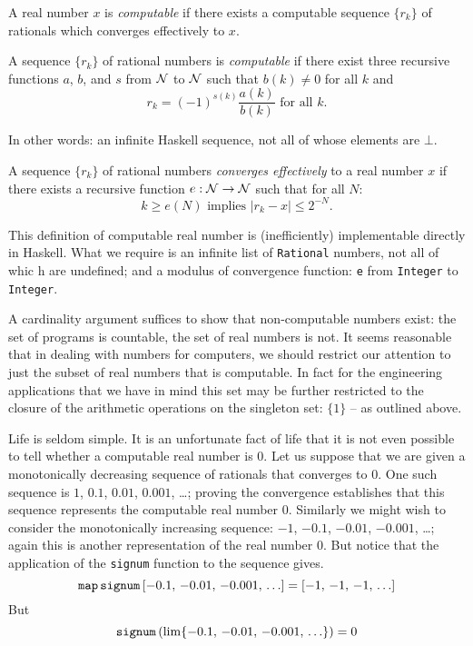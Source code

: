 \begin{definition}\rm
A real number $x$ is {\em computable} if there exists a computable
sequence $\{r_k\}$ of rationals which converges effectively to $x$.
\end{definition}

\begin{definition}\rm
A sequence $\{r_k\}$ of rational numbers is {\em computable} if there
exist three recursive functions $a$, $b$, and $s$ from ${\cal N}$ to
${\cal N}$ such that $b(k) \not= 0$ for all $k$ and
\[r_k = (-1)^{s(k)}\frac{a(k)}{b(k)} \mbox{ for all } k.\]
\end{definition}

In other words: an infinite {\sc Haskell} sequence, not all of whose
elements are $\bot$.

\begin{definition}\rm
A sequence $\{r_k\}$ of rational numbers {\em converges effectively}
to a real number $x$ if there exists a recursive function $e:{\cal
N}\to{\cal N}$ such that for all $N$:
\[k \geq e(N) \mbox{ implies } |r_k - x| \leq 2^{-N}.\]
\end{definition}

This definition of computable real number is (inefficiently)
implementable directly in {\sc Haskell}. What we require is an
infinite list of \mbox{\tt Rational} numbers, not all of whic
h are undefined;
and a modulus of convergence function: \mbox{\tt e} from \mbox{\tt Integer} to
\mbox{\tt Integer}.

A cardinality argument suffices to show that non-computable numbers
exist: the set of programs is countable, the set of real numbers is
not. It seems reasonable that in dealing with numbers for computers,
we should restrict our attention to just the subset of real numbers
that is computable. In fact for the engineering applications that we
have in mind this set may be further restricted to the closure of the
arithmetic operations on the singleton set: $\{1\}$ -- as outlined
above.

Life is seldom simple. It is an unfortunate fact of life that it is
not even possible to tell whether a computable real number is $0$.
Let us suppose that we are given a monotonically decreasing sequence
of rationals that converges to $0$. One such sequence is $1$, $0.1$,
$0.01$, $0.001$, \ldots; proving the convergence establishes that this
sequence represents the computable real number $0$.  Similarly we
might wish to consider the monotonically increasing sequence: $-1$,
$-0.1$, $-0.01$, $-0.001$, \ldots; again this is another
representation of the real number $0$. But notice that the application
of the \mbox{\tt signum} function to the sequence gives.
\[\mbox{\tt map}\indexTT{map}\,\mbox{\tt signum}\indexTT{signum}\,[-0.1,\, -0.0
1,\, -0.001,\,\ldots] = 
[-1,\, -1,\, -1,\,\ldots]\]
But
\[\mbox{\tt signum}\indexTT{signum}\, (\lim\{-0.1,\, -0.01,\, -0.001,\,\ldots\}
) = 0\]

